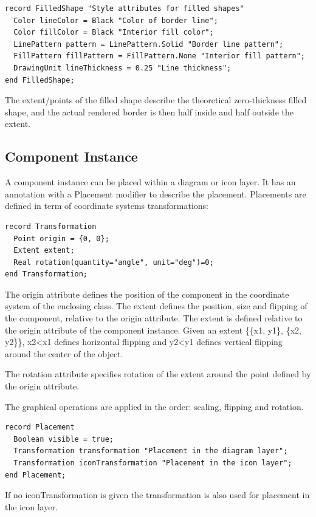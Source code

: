 \documentclass[10pt,a4paper]{report}
\def\doublelabel#1{\label{#1}}
\begin{document}
\begin{lstlisting}[language=modelica]
record FilledShape "Style attributes for filled shapes"
  Color lineColor = Black "Color of border line";
  Color fillColor = Black "Interior fill color";
  LinePattern pattern = LinePattern.Solid "Border line pattern";
  FillPattern fillPattern = FillPattern.None "Interior fill pattern";
  DrawingUnit lineThickness = 0.25 "Line thickness";
end FilledShape;
\end{lstlisting}
The extent/points of the filled shape describe the theoretical
zero-thickness filled shape, and the actual rendered border is then half
inside and half outside the extent.

\subsection{Component Instance}\doublelabel{component-instance}

A component instance can be placed within a diagram or icon layer. It
has an annotation with a Placement modifier to describe the placement.
Placements are defined in term of coordinate systems transformations:

\begin{lstlisting}[language=modelica]
record Transformation
  Point origin = {0, 0};
  Extent extent;
  Real rotation(quantity="angle", unit="deg")=0;
end Transformation;
\end{lstlisting}
The origin attribute defines the position of the component in the
coordinate system of the enclosing class. The extent defines the
position, size and flipping of the component, relative to the origin
attribute. The extent is defined relative to the origin attribute of the
component instance. Given an extent \{\{x1, y1\}, \{x2, y2\}\},
x2\textless{}x1 defines horizontal flipping and y2\textless{}y1 defines
vertical flipping around the center of the object.

The rotation attribute specifies rotation of the extent around the point
defined by the origin attribute.

The graphical operations are applied in the order: scaling, flipping and
rotation.

\begin{lstlisting}[language=modelica]
record Placement
  Boolean visible = true;
  Transformation transformation "Placement in the diagram layer";
  Transformation iconTransformation "Placement in the icon layer";
end Placement;
\end{lstlisting}
If no iconTransformation is given the transformation is also used for
placement in the icon layer.
\end{document}
